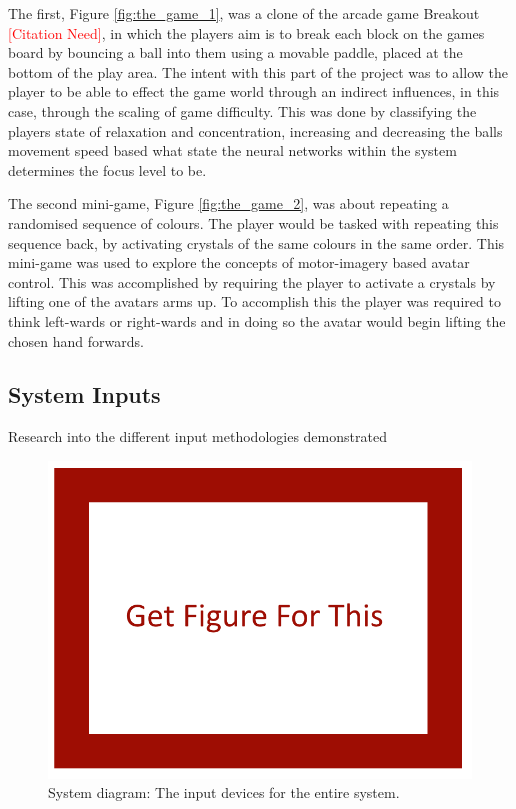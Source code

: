 \documentclass[11pt, a4paper]{article}
\newcommand{\addcitation}{\textcolor{red}{[Citation Need]}}
\newcommand{\reffigure}[1]{Figure \ref{#1}}
\begin{document}
The first, \reffigure{fig:the_game_1}, was a clone of the arcade game Breakout \addcitation{}, in which the players aim is to break each block on the games board by bouncing a ball into them using a movable paddle, placed at the bottom of the play area. The intent with this part of the project was to allow the player to be able to effect the game world through an indirect influences, in this case, through the scaling of game difficulty. This was done by classifying the players state of relaxation and concentration, increasing and decreasing the balls movement speed based what state the neural networks within the system determines the focus level to be.

The second mini-game, \reffigure{fig:the_game_2}, was about repeating a randomised sequence of colours. The player would be tasked with repeating this sequence back, by activating crystals of the same colours in the same order. This mini-game was used to explore the concepts of motor-imagery based avatar control. This was accomplished by requiring the player to activate a crystals by lifting one of the avatars arms up. To accomplish this the player was required to think left-wards or right-wards and in doing so the avatar would begin lifting the chosen hand forwards. 






\pagebreak
\subsection{System Inputs}	
Research into the different input methodologies demonstrated 


\begin{figure}[H]
	\centering
	\includegraphics[width = 0.7 \linewidth] {[ Figures ]/Get Figure.png}
	\caption{System diagram: The input devices for the entire system.}
	\label{fig:system_diagram_:_inputs}
\end{figure}
\end{document}
